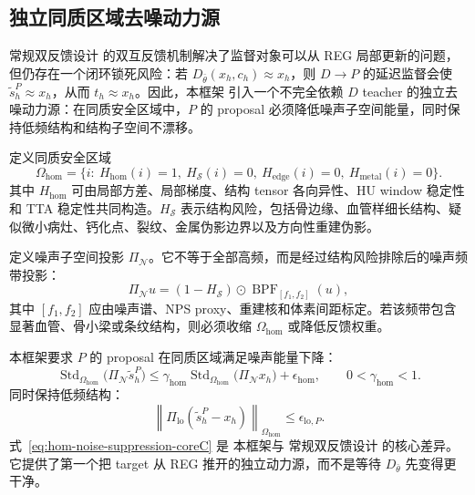 \documentclass[11pt,a4paper,UTF8,fontset=fandol]{ctexart}
\theoremstyle{definition}
\DeclareMathOperator{\Std}{Std}
\DeclareMathOperator{\BPF}{BPF}
\newcommand{\norm}[1]{\left\lVert#1\right\rVert}
\begin{document}
\subsection{独立同质区域去噪动力源}
\label{subsec:coreC-independent-homogeneous-pressure}

常规双反馈设计 的双互反馈机制解决了监督对象可以从 REG 局部更新的问题，但仍存在一个闭环锁死风险：若 $D_{\bar\theta}(x_h,c_h)\approx x_h$，则 $D\to P$ 的延迟监督会使 $\tilde s_h^P\approx x_h$，从而 $t_h\approx x_h$。因此，本框架 引入一个不完全依赖 $D$ teacher 的独立去噪动力源：在同质安全区域中，$P$ 的 proposal 必须降低噪声子空间能量，同时保持低频结构和结构子空间不漂移。

定义同质安全区域
\begin{equation}
\label{eq:omega-hom-coreC}
    \Omega_{\mathrm{hom}}
    =\{i:\ H_{\mathrm{hom}}(i)=1,\ H_{\mathcal S}(i)=0,\ H_{\mathrm{edge}}(i)=0,\ H_{\mathrm{metal}}(i)=0\}.
\end{equation}
其中 $H_{\mathrm{hom}}$ 可由局部方差、局部梯度、结构 tensor 各向异性、HU window 稳定性和 TTA 稳定性共同构造。$H_{\mathcal S}$ 表示结构风险，包括骨边缘、血管样细长结构、疑似微小病灶、钙化点、裂纹、金属伪影边界以及方向性重建伪影。

定义噪声子空间投影 $\Pi_{\mathcal N}$。它不等于全部高频，而是经过结构风险排除后的噪声频带投影：
\begin{equation}
\label{eq:noise-subspace-coreC}
    \Pi_{\mathcal N}u
    = (1-H_{\mathcal S})\odot \BPF_{[f_1,f_2]}(u),
\end{equation}
其中 $[f_1,f_2]$ 应由噪声谱、NPS proxy、重建核和体素间距标定。若该频带包含显著血管、骨小梁或条纹结构，则必须收缩 $\Omega_{\mathrm{hom}}$ 或降低反馈权重。

本框架要求 $P$ 的 proposal 在同质区域满足噪声能量下降：
\begin{equation}
\label{eq:hom-noise-suppression-coreC}
    \Std_{\Omega_{\mathrm{hom}}}\big(\Pi_{\mathcal N}\tilde s_h^P\big)
    \le
    \gamma_{\mathrm{hom}}
    \Std_{\Omega_{\mathrm{hom}}}\big(\Pi_{\mathcal N}x_h\big)+\epsilon_{\mathrm{hom}},
    \qquad 0<\gamma_{\mathrm{hom}}<1.
\end{equation}
同时保持低频结构：
\begin{equation}
\label{eq:hom-lowfreq-anchor-coreC}
    \norm{\Pi_{\mathrm{lo}}(\tilde s_h^P-x_h)}_{\Omega_{\mathrm{hom}}}
    \le \epsilon_{\mathrm{lo},P}.
\end{equation}
式~\eqref{eq:hom-noise-suppression-coreC} 是 本框架与 常规双反馈设计 的核心差异。它提供了第一个把 target 从 REG 推开的独立动力源，而不是等待 $D_{\bar\theta}$ 先变得更干净。
\end{document}
